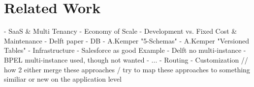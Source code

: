 \section{Related Work}

- SaaS & Multi Tenancy
  - Economy of Scale
    - Development vs. Fixed Cost & Maintenance
    - Delft paper
- DB
  - A.Kemper "5-Schemas"
  - A.Kemper "Versioned Tables"
- Infrastructure
  - Salesforce as good Example
  - Delft no multi-instance
  - BPEL multi-instance used, though not wanted
- ...
  - Routing
  - Customization // how 2 either merge these approaches / try to map these approaches to something similiar or new on the application level
